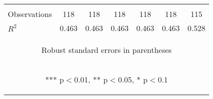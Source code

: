 \begin{center}
\begin{tabular}{lcccccc}
\vspace{4pt} & \begin{footnotesize}\end{footnotesize} & \begin{footnotesize}\end{footnotesize} & \begin{footnotesize}\end{footnotesize} & \begin{footnotesize}\end{footnotesize} & \begin{footnotesize}\end{footnotesize} & \begin{footnotesize}\end{footnotesize} \\
Observations & 118 & 118 & 118 & 118 & 118 & 115 \\
 $R^2$ & 0.463 & 0.463 & 0.463 & 0.463 & 0.463 & 0.528 \\ \hline
\multicolumn{7}{c}{\begin{footnotesize} Robust standard errors in parentheses\end{footnotesize}} \\
\multicolumn{7}{c}{\begin{footnotesize} *** p$<$0.01, ** p$<$0.05, * p$<$0.1\end{footnotesize}} \\
\end{tabular}
\end{center}
